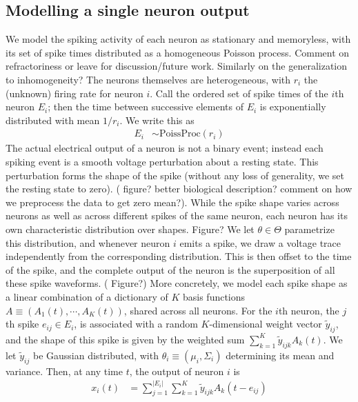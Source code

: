 \subsection{Modelling a single neuron output}
We model the spiking activity of each neuron as stationary and memoryless, with its set of spike times distributed as a homogeneous Poisson process. 
{\color{red} Comment on refractoriness or leave for
discussion/future work. Similarly on the generalization to inhomogeneity?} The neurons themselves are heterogeneous, with $r_i$ the (unknown) firing 
rate for neuron $i$. Call the ordered set of spike times of the $i$th neuron $E_i$; then the time between successive elements of $E_i$ is exponentially 
distributed with mean $1/r_i$. 
We write this as
\begin{align}
  E_i &\sim \text{PoissProc}(r_i)
\end{align}
The actual electrical output of a neuron is not a binary event; instead each spiking event is a smooth voltage perturbation about a
resting state. This perturbation forms the shape of the spike (without any loss of generality, we set the resting state to zero). 
{(\color{red} figure? better biological description? comment on how we preprocess the data to get zero mean?)}. 
While the spike shape varies across neurons as well as across different spikes of the same neuron, each 
neuron has its own characteristic distribution over shapes. {\color{red} Figure? } 
We let $\theta \in \Theta$ parametrize this distribution, and whenever neuron $i$ emits a 
spike, we draw a voltage trace independently from the corresponding distribution. %
This is then offset to the time of the spike, and the complete output of the neuron is the superposition of all these spike waveforms. 
{\color{red} ( Figure?)} %
More concretely, we model each spike shape as a linear combination of a dictionary of $K$ basis functions $A \equiv (A_1(t), \cdots, A_K(t))$, shared across 
all neurons.
For the $i$th neuron, the $j$th spike $e_{ij} \in E_i$, is associated with a random $K$-dimensional weight vector $\tilde{y}_{ij}$, and the 
shape of this spike is given by the weighted sum $\sum_{k=1}^K \tilde{y}_{ijk} A_k(t)$. We let $\tilde{y}_{ij}$ be Gaussian distributed, with 
$\theta_i \equiv (\mu_i, \Sigma_i)$ determining its 
mean and variance. Then, at any time $t$, the output of neuron $i$ is
\begin{align}
  x_{i}(t) &= \sum_{j=1}^{|E_i|} \sum_{k=1}^K \tilde{y}_{ijk} A_k(t - e_{ij})
\end{align}

